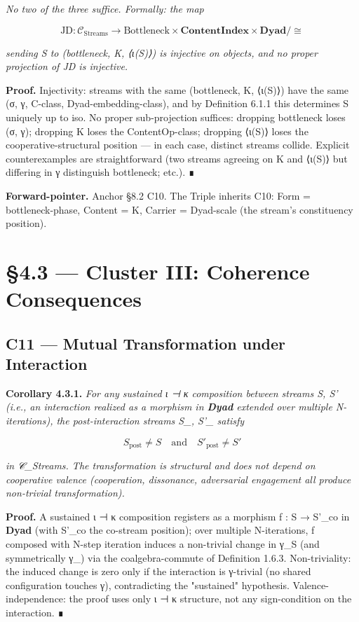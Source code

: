 \documentclass[11pt, openany]{book}
\newcommand{\sectionbreak}{\clearpage}
\begin{document}
\textit{No two of the three suffice. Formally: the map}

\[
\mathrm{JD} : \mathcal{C}_\mathrm{Streams} \to \mathrm{Bottleneck} \times \mathbf{ContentIndex} \times \mathbf{Dyad}/\cong
\]

\textit{sending S to (bottleneck, K, ⟨ι(S)⟩) is injective on objects, and no proper projection of JD is injective.}

\textbf{Proof.} Injectivity: streams with the same (bottleneck, K, ⟨ι(S)⟩) have the same (σ, γ, C-class, Dyad-embedding-class), and by Definition 6.1.1 this determines S uniquely up to iso. No proper sub-projection suffices: dropping bottleneck loses (σ, γ); dropping K loses the ContentOp-class; dropping ⟨ι(S)⟩ loses the cooperative-structural position --- in each case, distinct streams collide. Explicit counterexamples are straightforward (two streams agreeing on K and ⟨ι(S)⟩ but differing in γ distinguish bottleneck; etc.). ∎

\textbf{Forward-pointer.} Anchor §8.2 C10. The Triple inherits C10: Form = bottleneck-phase, Content = K, Carrier = Dyad-scale (the stream's constituency position).

\sectionbreak

\section{§4.3 --- Cluster III: Coherence Consequences}

\subsection{C11 --- Mutual Transformation under Interaction}

\textbf{Corollary 4.3.1.} \textit{For any sustained ι ⊣ κ composition between streams S, S' (i.e., an interaction realized as a morphism in \textbf{Dyad} extended over multiple N-iterations), the post-interaction streams S\_, S'\_ satisfy}

\[
S_\mathrm{post} \neq S \quad \text{and} \quad S'_\mathrm{post} \neq S'
\]

\textit{in 𝒞\_\allowbreak{}Streams. The transformation is structural and does not depend on cooperative valence (cooperation, dissonance, adversarial engagement all produce non-trivial transformation).}

\textbf{Proof.} A sustained ι ⊣ κ composition registers as a morphism f : S → S'\_\allowbreak{}co in \textbf{Dyad} (with S'\_\allowbreak{}co the co-stream position); over multiple N-iterations, f composed with N-step iteration induces a non-trivial change in γ\_\allowbreak{}S (and symmetrically γ\_) via the coalgebra-commute of Definition 1.6.3. Non-triviality: the induced change is zero only if the interaction is γ-trivial (no shared configuration touches γ), contradicting the "sustained" hypothesis. Valence-independence: the proof uses only ι ⊣ κ structure, not any sign-condition on the interaction. ∎
\end{document}
